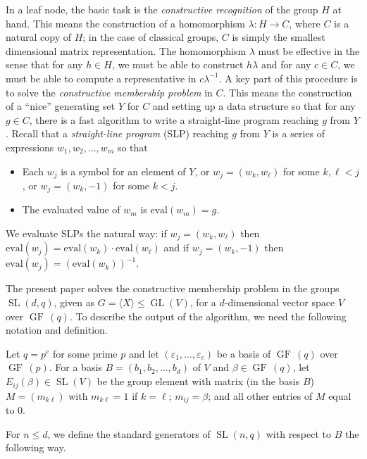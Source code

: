 \documentclass[a4paper,11pt]{article}
\def\GF{\operatorname{GF\,}}
\def\GL{\operatorname{GL}}
\def\SL{\operatorname{SL}}
\newcommand{\eval}{\mathrm{eval}}
\begin{document}
In a leaf node, the basic task is the {\em constructive recognition} of
the group $H$ at hand. This means the construction of a homomorphism
$\lambda: H \to C$, where $C$ is a natural copy of $H$; in the case
of classical groups, $C$ is simply the smallest dimensional matrix
representation. The homomorphism $\lambda$ must be effective in the
sense that for any $h \in H$, we must be able to construct $h\lambda$
and for any $c \in C$, we must be able to compute a representative in
$c\lambda^{-1}$. A key part of this procedure is to solve the {\em
constructive membership problem} in $C$. This means the construction of
a ``nice'' generating set $Y$ for $C$ and setting up a data structure
so that for any $g \in C$, there is a fast algorithm to write a
straight-line program reaching $g$ from $Y$. Recall that a {\em
straight-line program} (SLP) reaching $g$ from $Y$ is a series of
expressions $w_1,w_2,\ldots,w_m$ so that
\begin{itemize}
\item Each $w_j$ is a symbol for an element of $Y$, or
$w_j=(w_k,w_{\ell})$ for some $k,\ell <j$, or $w_j=(w_k,-1)$ for some
$k<j$.
\item The evaluated value of $w_m$ is $\eval(w_m)=g$.
\end{itemize}
We evaluate SLPs the natural way: if $w_j=(w_k,w_{\ell})$ then
$\eval(w_j)=\eval(w_k) \cdot \eval(w_{\ell})$ and if $w_j=(w_k,-1)$ then
$\eval(w_j)=(\eval(w_k))^{-1}$.

The present paper solves the constructive membership problem in the
groups $\SL(d,q)$, given as $G = \langle X \rangle \le \GL(V)$, for a
$d$-dimensional vector space $V$ over $\GF(q)$. To describe the output
of the algorithm, we need the following notation and definition.

Let $q=p^e$ for some prime $p$ and let $(\varepsilon_1, \ldots, \varepsilon_e)$
be a basis of $\GF(q)$ over $\GF(p)$.
For a basis $B=(b_1,b_2,\ldots,b_d)$    
of $V$ and $\beta \in \GF(q)$, let $E_{ij}(\beta) \in \SL(V)$ be      
the group element with matrix (in the basis $B$) $M=(m_{k\ell})$ with   
$m_{k\ell}=1$ if $k=\ell$; $m_{ij}=\beta$; and all other entries of    
$M$ equal to $0$.                                                       

For $n \le d$, we define the standard generators of $\SL(n,q)$ with 
respect to $B$ the following way.
\end{document}
